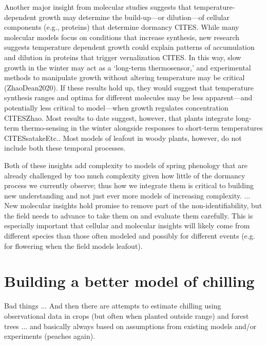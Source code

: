 \documentclass[11pt]{article}
\begin{document}
Another major insight from molecular studies suggests that temperature-dependent growth may determine the build-up---or dilution---of cellular components (e.g., proteins) that determine dormancy CITES. While many molecular models focus on conditions that increase synthesis, new research suggests temperature dependent growth could explain patterns of accumulation and dilution in proteins that trigger vernalization CITES. In this way, slow growth in the winter may act as a `long-term thermosensor,' and experimental methods to manipulate growth without altering temperature may be critical (ZhaoDean2020). If these results hold up, they would suggest that temperature synthesis ranges and optima for different molecules may be less apparent---and potentially less critical to model---when growth regulates concentration CITESZhao. Most results to date suggest, however, that plants integrate long-term thermo-sensing in the winter alongside responses to short-term temperatures CITESsatakeEtc.. Most models of leafout in woody plants, however, do not include both these temporal processes. 


Both of these insights add complexity to models of spring phenology that are already challenged by too much complexity given how little of the dormancy process we currently observe; thus how we integrate them is critical to building new understanding and not just ever more models of increasing complexity. ... New molecular insights hold promise to remove part of the non-identifiability, but the field needs to advance to take them on and evaluate them carefully. This is especially important that cellular and molecular insights will likely come from different species than those often modeled and possibly for different events (e.g. for flowering when the field models leafout). 

\section*{Building a better model of chilling} %

Bad things ...
And then there are attempts to estimate chilling using observational data in crops (but often when planted outside range) and forest trees ... and basically always based on assumptions from existing models and/or experiments (peaches again).
\end{document}
